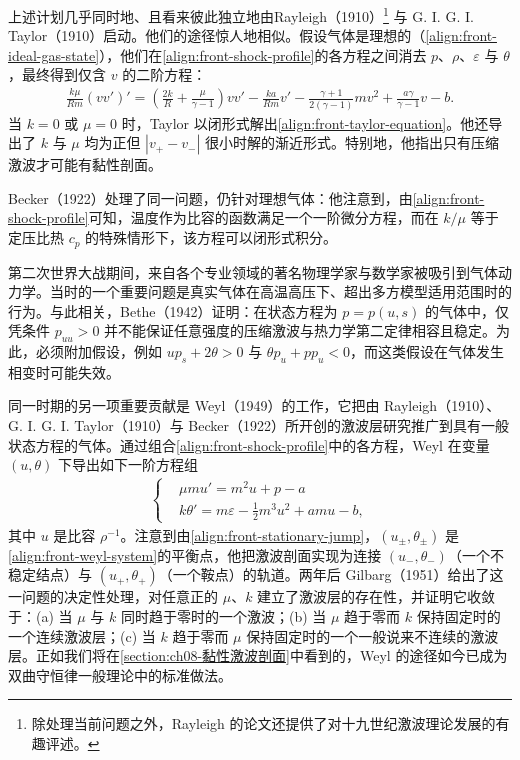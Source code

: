 \documentclass[../../main.tex]{subfiles}
\begin{document}
上述计划几乎同时地、且看来彼此独立地由Rayleigh（1910）\footnote{除处理当前问题之外，Rayleigh 的论文还提供了对十九世纪激波理论发展的有趣评述。} 与 G. I. G. I. Taylor（1910）启动。他们的途径惊人地相似。假设气体是理想的（\eqref{align:front-ideal-gas-state}），他们在\eqref{align:front-shock-profile}的各方程之间消去 $p$、$\rho$、$\varepsilon$ 与 $\theta$，最终得到仅含 $v$ 的二阶方程：
\begin{align}
\frac{k\mu}{Rm}(vv')'=\left(\frac{2k}{R}+\frac{\mu}{\gamma-1}\right)vv'-\frac{ka}{Rm}v'
-\frac{\gamma+1}{2(\gamma-1)}mv^{2}+\frac{a\gamma}{\gamma-1}v-b.\label{align:front-taylor-equation}
\end{align}
当 $k=0$ 或 $\mu=0$ 时，Taylor 以闭形式解出\eqref{align:front-taylor-equation}。他还导出了 $k$ 与 $\mu$ 均为正但 $|v_+-v_-|$ 很小时解的渐近形式。特别地，他指出只有压缩激波才可能有黏性剖面。

Becker（1922）处理了同一问题，仍针对理想气体：他注意到，由\eqref{align:front-shock-profile}可知，温度作为比容的函数满足一个一阶微分方程，而在 $k/\mu$ 等于定压比热 $c_p$ 的特殊情形下，该方程可以闭形式积分。

第二次世界大战期间，来自各个专业领域的著名物理学家与数学家被吸引到气体动力学。当时的一个重要问题是真实气体在高温高压下、超出多方模型适用范围时的行为。与此相关，Bethe（1942）证明：在状态方程为 $p=p(u,s)$ 的气体中，仅凭条件 $p_{uu}>0$ 并不能保证任意强度的压缩激波与热力学第二定律相容且稳定。为此，必须附加假设，例如 $up_s+2\theta>0$ 与 $\theta p_u+pp_u<0$，而这类假设在气体发生相变时可能失效。

同一时期的另一项重要贡献是 Weyl（1949）的工作，它把由 Rayleigh（1910）、G. I. G. I. Taylor（1910）与 Becker（1922）所开创的激波层研究推广到具有一般状态方程的气体。通过组合\eqref{align:front-shock-profile}中的各方程，Weyl 在变量 $(u,\theta)$ 下导出如下一阶方程组
\begin{align}
\left\{\begin{aligned}
&\mu mu'=m^{2}u+p-a\\
&k\theta'=m\varepsilon-\frac{1}{2}m^{3}u^{2}+amu-b,
\end{aligned}\right.\label{align:front-weyl-system}
\end{align}
其中 $u$ 是比容 $\rho^{-1}$。注意到由\eqref{align:front-stationary-jump}，$(u_\pm,\theta_\pm)$ 是\eqref{align:front-weyl-system}的平衡点，他把激波剖面实现为连接 $(u_-,\theta_-)$（一个不稳定结点）与 $(u_+,\theta_+)$（一个鞍点）的轨道。两年后 Gilbarg（1951）给出了这一问题的决定性处理，对任意正的 $\mu$、$k$ 建立了激波层的存在性，并证明它收敛于：(a) 当 $\mu$ 与 $k$ 同时趋于零时的一个激波；(b) 当 $\mu$ 趋于零而 $k$ 保持固定时的一个连续激波层；(c) 当 $k$ 趋于零而 $\mu$ 保持固定时的一个一般说来不连续的激波层。正如我们将在\cref{section:ch08-黏性激波剖面}中看到的，Weyl 的途径如今已成为双曲守恒律一般理论中的标准做法。
\end{document}

